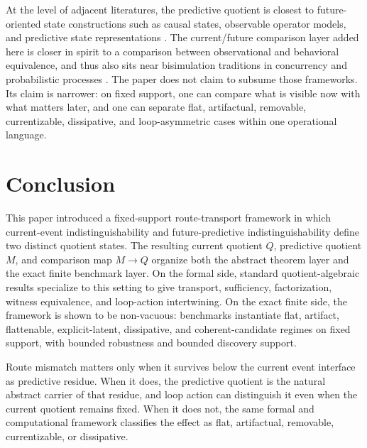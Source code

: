\documentclass[11pt]{article}
\newcommand{\CurrentQ}{Q}
\newcommand{\PredictiveQ}{M}
\theoremstyle{definition}
\begin{document}
At the level of adjacent literatures, the predictive quotient is closest to future-oriented state constructions such as causal states, observable operator models, and predictive state representations \citep{ShaliziCrutchfield2001ComputationalMechanics,Jaeger2000ObservableOperatorModels,LittmanSuttonSingh2002PredictiveRepresentationsState}. The current/future comparison layer added here is closer in spirit to a comparison between observational and behavioral equivalence, and thus also sits near bisimulation traditions in concurrency and probabilistic processes \citep{Park1981ConcurrencyAutomata,Milner1989CommunicationConcurrency,LarsenSkou1991BisimulationThroughProbabilisticTesting}. The paper does not claim to subsume those frameworks. Its claim is narrower: on fixed support, one can compare what is visible now with what matters later, and one can separate flat, artifactual, removable, currentizable, dissipative, and loop-asymmetric cases within one operational language.

\section{Conclusion}\label{sec:conclusion}
This paper introduced a fixed-support route-transport framework in which current-event indistinguishability and future-predictive indistinguishability define two distinct quotient states. The resulting current quotient $\CurrentQ$, predictive quotient $\PredictiveQ$, and comparison map $\PredictiveQ \to \CurrentQ$ organize both the abstract theorem layer and the exact finite benchmark layer. On the formal side, standard quotient-algebraic results specialize to this setting to give transport, sufficiency, factorization, witness equivalence, and loop-action intertwining. On the exact finite side, the framework is shown to be non-vacuous: benchmarks instantiate flat, artifact, flattenable, explicit-latent, dissipative, and coherent-candidate regimes on fixed support, with bounded robustness and bounded discovery support.

Route mismatch matters only when it survives below the current event interface as predictive residue. When it does, the predictive quotient is the natural abstract carrier of that residue, and loop action can distinguish it even when the current quotient remains fixed. When it does not, the same formal and computational framework classifies the effect as flat, artifactual, removable, currentizable, or dissipative.

\appendix
\end{document}
